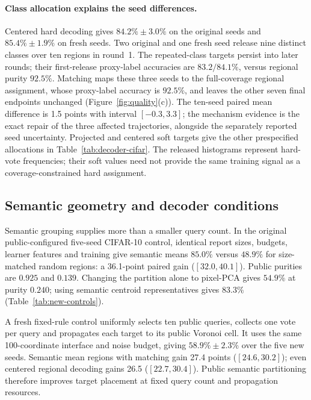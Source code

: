 \paragraph{Class allocation explains the seed differences.}
Centered hard decoding gives $84.2\%\pm3.0\%$ on the original seeds and
$85.4\%\pm1.9\%$ on fresh seeds. Two original and one fresh seed release
nine distinct classes over ten regions in round~1. The repeated-class targets
persist into later rounds; their first-release proxy-label accuracies are
$83.2/84.1\%$, versus regional purity $92.5\%$.
Matching maps these three seeds to the full-coverage regional assignment,
whose proxy-label accuracy is $92.5\%$, and leaves the other seven final
endpoints unchanged (Figure~\ref{fig:quality}(c)).
The ten-seed paired mean difference is 1.5 points with interval
$[-0.3,3.3]$; the mechanism evidence is the exact repair of the three affected
trajectories, alongside the separately reported seed uncertainty.
Projected and centered soft targets give the other prespecified allocations
in Table~\ref{tab:decoder-cifar}. The released histograms represent hard-vote
frequencies; their soft values need not provide the same training signal as
a coverage-constrained hard assignment.

\subsection{Semantic geometry and decoder conditions}
\label{sec:eval:semantic}

Semantic grouping supplies more than a smaller query count. In the original
public-configured five-seed CIFAR-10 control, identical report sizes, budgets,
learner features and training give semantic means $85.0\%$ versus $48.9\%$
for size-matched random regions: a 36.1-point paired gain ($[32.0,40.1]$).
Public purities are $0.925$ and $0.139$. Changing the partition alone to
pixel-PCA gives $54.9\%$ at purity $0.240$; using semantic centroid
representatives gives $83.3\%$ (Table~\ref{tab:new-controls}).

A fresh fixed-rule control uniformly selects ten public queries, collects
one vote per query and propagates each target to its public Voronoi cell.
It uses the same 100-coordinate interface and noise budget, giving
$58.9\%\pm2.3\%$ over the five new seeds. Semantic mean regions with matching
gain 27.4 points ($[24.6,30.2]$); even centered regional decoding gains
26.5 ($[22.7,30.4]$). Public semantic partitioning therefore improves target
placement at fixed query count and propagation resources.

